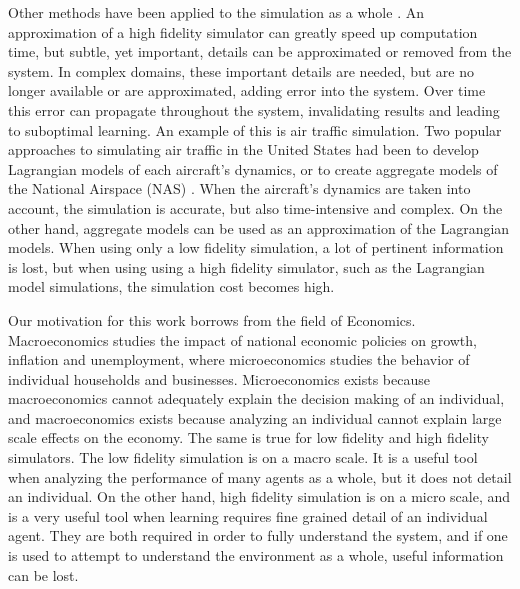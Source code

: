 \documentclass{aamas2014}
\begin{document}
Other methods have been applied to the simulation as a whole \cite{eps23053}. An approximation of a high fidelity simulator can greatly speed up computation time, but subtle, yet important, details can be approximated or removed from the system. In complex domains, these important details are needed, but are no longer available or are approximated, adding error into the system. Over time this error can propagate throughout the system, invalidating results and leading to suboptimal learning. An example of this is air traffic simulation. Two popular approaches to simulating air traffic in the United States had been to develop Lagrangian models of each aircraft's dynamics, or to create aggregate models of the National Airspace (NAS) \cite{Bertsimas:1998:ATF:767667.768027, McNally, Mueller_analysisof}. When the aircraft's dynamics are taken into account, the simulation is accurate, but also time-intensive and complex. On the other hand, aggregate models can be used as an approximation of the Lagrangian models. When using only a low fidelity simulation, a lot of pertinent information is lost, but when using using a high fidelity simulator, such as the Lagrangian model simulations, the simulation cost becomes high.


Our motivation for this work borrows from the field of Economics. Macroeconomics studies the impact of national economic policies on growth, inflation and unemployment, where microeconomics studies the behavior of individual households and businesses. Microeconomics exists because macroeconomics cannot adequately explain the decision making of an individual, and macroeconomics exists because analyzing an individual cannot explain large scale effects on the economy. The same is true for low fidelity and high fidelity simulators. The low fidelity simulation is on a macro scale. It is a useful tool when analyzing the performance of many agents as a whole, but it does not detail an individual. On the other hand, high fidelity simulation is on a micro scale, and is a very useful tool when learning requires fine grained detail of an individual agent. They are both required in order to fully understand the system, and if one is used to attempt to understand the environment as a whole, useful information can be lost.
\end{document}
